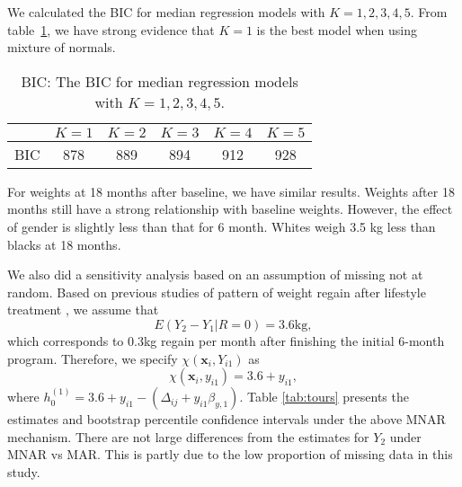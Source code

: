 \documentclass[useAMS,usenatbib,referee]{biom}
\begin{document}
We calculated the BIC for median regression models with $K = 1, 2, 3, 4, 5$. From table~\ref{tab:bic}, we have strong evidence that $K = 1$ is the best model when using mixture of normals.

\begin{table}[htbp]
\caption[]{\label{tab:bic} BIC: The BIC for median regression models with $K = 1, 2, 3, 4, 5$.}
\vspace{4mm}
\begin{center}
\begin{tabular}[h]{cccccc}
\hline
& $K = 1$ & $K = 2$ & $K = 3$ & $K = 4$ & $K = 5$ \\
\hline
BIC & 878 & 889     & 894     & 912     & 928     \\
\hline
\end{tabular}
\end{center}
\end{table}

For weights at 18 months after baseline, we have similar results.
Weights after 18 months still have a strong relationship with baseline weights.
However, the effect of gender is slightly less than that for 6 month.
Whites weigh 3.5 kg less than blacks at 18 months.

We also did a sensitivity analysis based on an assumption of missing
not at random.  Based on previous studies of pattern of weight regain
after lifestyle treatment \citep{wadden2001, perri2008extended}, we
assume that
\begin{displaymath}
  E(Y_2 - Y_1| R=0) = 3.6 \mbox{kg},
\end{displaymath}
which corresponds to 0.3kg regain per month after finishing the
initial 6-month program.
Therefore, we specify  $\chi(\bm x_{i}, Y_{i1})$ as
\begin{displaymath}
\chi(\bm x_{i},  y_{i1}) = 3.6  + y_{i1},
\end{displaymath}
where $h_0^{(1)} = 3.6 + y_{i1} - (\Delta_{ij} + y_{i1} \beta_{y,1})$.
Table \ref{tab:tours} presents the estimates and bootstrap percentile
confidence intervals under the above MNAR mechanism. There are not
large differences from the estimates for $Y_2$ under MNAR vs MAR. This is
partly due to the low proportion of missing data in this study.

\end{document}
